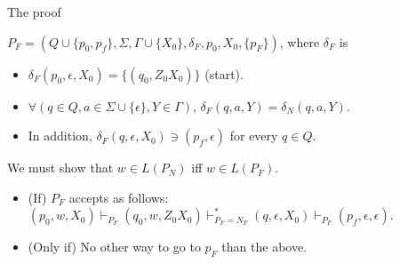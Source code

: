 \documentclass[handout]{beamer}
\begin{document}
\begin{frame}{The proof}

    $P_F=(Q\cup \{p_0,p_f\},\Sigma,\Gamma\cup\{X_0\},\delta_F,p_0,X_0,\{p_F\})$, where $\delta_F$ is
    \begin{itemize}
        \item $\delta_F(p_0,\epsilon,X_0)=\{(q_0,Z_0X_0)\}$ (start).
        \item $\forall (q\in Q, a\in \Sigma\cup\{\epsilon\},Y\in \Gamma)$, $\delta_F(q,a,Y)=\delta_N(q,a,Y)$.
        \item In addition, $\delta_F(q,\epsilon,X_0)\ni (p_f,\epsilon)$ for every $q\in Q$.
    \end{itemize}
    We must show that $w\in L(P_N)$ iff $w\in L(P_F)$.
    \begin{itemize}
        \item (If) $P_F$ accepts as follows: $(p_0,w,X_0)\vdash_{P_F}(q_0,w,Z_0X_0)\vdash^*_{P_F=N_F}(q,\epsilon,X_0)\vdash_{P_F}(p_f,\epsilon,\epsilon) $.
        \item (Only if) No other way to go to $p_F$ than the above. \hfill\qedsymbol
    \end{itemize}
    

\end{frame}
\end{document}
